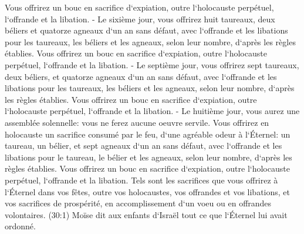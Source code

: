 \verse Vous offrirez un bouc en sacrifice d`expiation, outre l`holocauste perpétuel, l`offrande et la libation. - 
\verse Le sixième jour, vous offrirez huit taureaux, deux béliers et quatorze agneaux d`un an sans défaut, 
\verse avec l`offrande et les libations pour les taureaux, les béliers et les agneaux, selon leur nombre, d`après les règles établies. 
\verse Vous offrirez un bouc en sacrifice d`expiation, outre l`holocauste perpétuel, l`offrande et la libation. - 
\verse Le septième jour, vous offrirez sept taureaux, deux béliers, et quatorze agneaux d`un an sans défaut, 
\verse avec l`offrande et les libations pour les taureaux, les béliers et les agneaux, selon leur nombre, d`après les règles établies. 
\verse Vous offrirez un bouc en sacrifice d`expiation, outre l`holocauste perpétuel, l`offrande et la libation. - 
\verse Le huitième jour, vous aurez une assemblée solennelle: vous ne ferez aucune oeuvre servile. 
\verse Vous offrirez en holocauste un sacrifice consumé par le feu, d`une agréable odeur à l`Éternel: un taureau, un bélier, et sept agneaux d`un an sans défaut, 
\verse avec l`offrande et les libations pour le taureau, le bélier et les agneaux, selon leur nombre, d`après les règles établies. 
\verse Vous offrirez un bouc en sacrifice d`expiation, outre l`holocauste perpétuel, l`offrande et la libation. 
\verse Tels sont les sacrifices que vous offrirez à l`Éternel dans vos fêtes, outre vos holocaustes, vos offrandes et vos libations, et vos sacrifices de prospérité, en accomplissement d`un voeu ou en offrandes volontaires. 
\verse (30:1) Moïse dit aux enfants d`Israël tout ce que l`Éternel lui avait ordonné. 

\chapter{}

